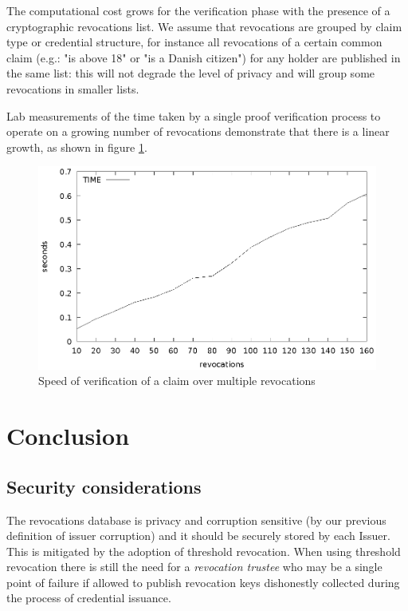 The computational cost grows for the verification phase with the presence of a cryptographic revocations list. We assume that revocations are grouped by claim type or credential structure, for instance all revocations of a certain common claim (e.g.: "is above 18" or "is a Danish citizen") for any holder are published in the same list: this will not degrade the level of privacy and will group some revocations in smaller lists.

Lab measurements of the time taken by a single proof verification process to operate on a growing number of revocations demonstrate that there is a linear growth, as shown in figure \ref{fig:verifyrevocations}.

\begin{figure}
    \centering
    \includegraphics[width=1\linewidth]{verifyrevocations.eps}

    \caption{Speed of verification of a claim over multiple revocations}
    \label{fig:verifyrevocations}
\end{figure}


\section{Conclusion}
\subsection{Security considerations}

The revocations database is privacy and corruption sensitive (by our
previous definition of issuer corruption) and it should be securely
stored by each Issuer. This is mitigated by the adoption of threshold
revocation. When using threshold revocation there is still the need
for a \textit{revocation trustee} who may be a single point of failure
if allowed to publish revocation keys dishonestly collected during the
process of credential issuance.


